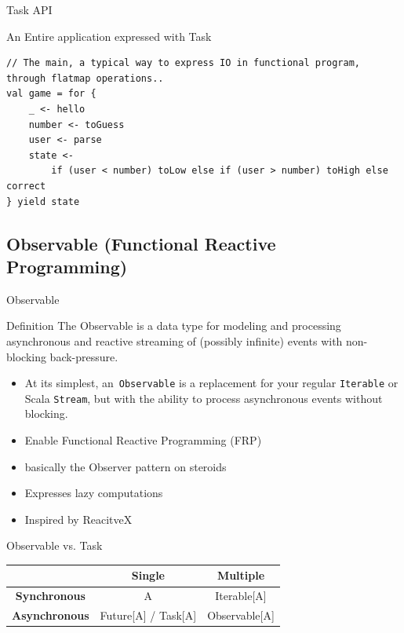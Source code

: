 \documentclass[presentation, 9pt]{beamer}\mode<presentation>{\usetheme{AMSBolognaFC}}
\begin{document}
\begin{frame}{Task API}
\begin{alertblock}{An Entire application expressed with Task}
\begin{tcolorbox}[left=0pt, top=0pt, bottom=0pt]
\begin{verbatim}
// The main, a typical way to express IO in functional program, through flatmap operations..
val game = for {
	_ <- hello
	number <- toGuess
	user <- parse
	state <-
		if (user < number) toLow else if (user > number) toHigh else correct
} yield state
					\end{verbatim}
				\end{tcolorbox}
		\end{alertblock}
\end{frame}
\subsection{Observable (Functional Reactive Programming)}
\begin{frame}{Observable \href{https://monix.io/docs/current/reactive/observable.html}{\faLink}}

	\begin{alertblock}{Definition}
		The Observable is a data type for modeling and processing asynchronous and reactive streaming of (possibly infinite) events with non-blocking back-pressure.
	\end{alertblock}
	\begin{itemize}
		\item At its simplest, an\ \texttt{Observable} is a replacement for your regular \texttt{Iterable} or Scala \texttt{Stream}, but with the ability to process asynchronous events without blocking.
  	\item Enable Functional Reactive Programming (FRP) 
   \item basically the Observer pattern on steroids
   \item Expresses lazy computations
   \item Inspired by ReacitveX \href{https://reactivex.io/intro.html}{\faLink}
	\end{itemize}
	\begin{alertblock}{Observable vs. Task}
		\begin{table}[]
			\centering
			\begin{tabular}{|c|c|c|}
			\hline
									 & \textbf{Single}                      & \textbf{Multiple}          \\ \hline
			\textbf{Synchronous}  & A                           & Iterable{[}A{]}   \\ \hline
			\textbf{Asynchronous} & Future{[}A{]} / Task{[}A{]} & Observable{[}A{]} \\ \hline
			\end{tabular}
			\end{table}
	\end{alertblock}
\end{frame}
\end{document}
